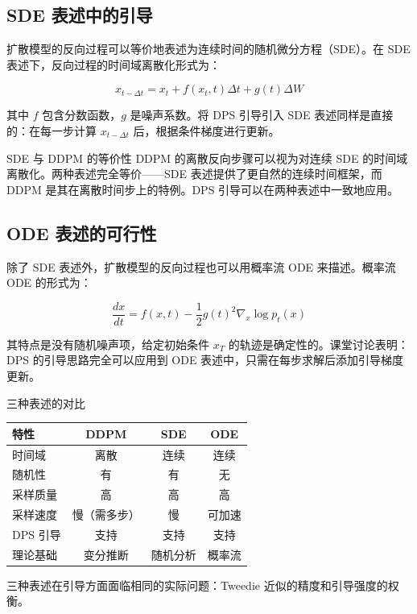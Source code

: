 \documentclass[a4paper]{article}
\begin{document}
\subsection{SDE 表述中的引导}

扩散模型的反向过程可以等价地表述为连续时间的随机微分方程（SDE）。在 SDE 表述下，反向过程的时间域离散化形式为：

$$x_{t-\Delta t} = x_t + f(x_t, t)\Delta t + g(t)\Delta W$$

其中 $f$ 包含分数函数，$g$ 是噪声系数。将 DPS 引导引入 SDE 表述同样是直接的：在每一步计算 $x_{t-\Delta t}$ 后，根据条件梯度进行更新。

\begin{importantbox}{SDE 与 DDPM 的等价性}
DDPM 的离散反向步骤可以视为对连续 SDE 的时间域离散化。两种表述完全等价——SDE 表述提供了更自然的连续时间框架，而 DDPM 是其在离散时间步上的特例。DPS 引导可以在两种表述中一致地应用。
\end{importantbox}

\subsection{ODE 表述的可行性}

除了 SDE 表述外，扩散模型的反向过程也可以用概率流 ODE 来描述。概率流 ODE 的形式为：

$$\frac{dx}{dt} = f(x, t) - \frac{1}{2}g(t)^2 \nabla_x \log p_t(x)$$

其特点是没有随机噪声项，给定初始条件 $x_T$ 的轨迹是确定性的。课堂讨论表明：DPS 的引导思路完全可以应用到 ODE 表述中，只需在每步求解后添加引导梯度更新。

\begin{knowledgebox}{三种表述的对比}
\begin{center}
\begin{tabular}{lccc}
\toprule
特性 & DDPM & SDE & ODE \\
\midrule
时间域 & 离散 & 连续 & 连续 \\
随机性 & 有 & 有 & 无 \\
采样质量 & 高 & 高 & 高 \\
采样速度 & 慢（需多步） & 慢 & 可加速 \\
DPS 引导 & 支持 & 支持 & 支持 \\
理论基础 & 变分推断 & 随机分析 & 概率流 \\
\bottomrule
\end{tabular}
\end{center}
三种表述在引导方面面临相同的实际问题：Tweedie 近似的精度和引导强度的权衡。
\end{knowledgebox}
\end{document}
